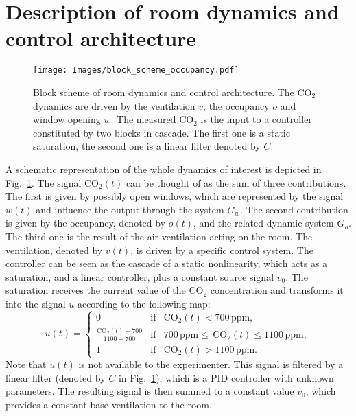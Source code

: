 \documentclass{article}
\begin{document}
\section{Description of room dynamics and control architecture}\label{sec:schematic}
\begin{figure}[htb]
\centering
\texttt{[image: Images/block\_scheme\_occupancy.pdf]}
\caption{Block scheme of room dynamics and control architecture. The CO$_2$ dynamics are driven by the ventilation $v$, the occupancy $o$ and window opening $w$. The measured CO$_2$ is the input to a controller constituted by two blocks in cascade. The first one is a static saturation, the second one is a linear filter denoted by $C$.}
\label{fig:block_scheme}
\end{figure}
A schematic representation of the whole dynamics of interest is depicted in
Fig.~\ref{fig:block_scheme}. The signal CO$_2(t)$ can be thought of as the sum
of three contributions. The first is given by possibly open windows, which are
represented by the signal $w(t)$ and influence the output through the system
$G_w$. The second contribution is given by the occupancy, denoted by $o(t)$,
and the related dynamic system $G_o$. The third one is the result of the air
ventilation acting on the room. The ventilation, denoted by $v(t)$, is driven
by a specific control system. The controller can be seen as the cascade of a
static nonlinearity, which acts as a saturation, and a linear controller, plus
a constant source signal $v_0$. The saturation receives the current value of
the CO$_2$ concentration and transforms it into the signal $u$ according to the
following map:
\begin{equation}\label{eq:saturator}
u(t) = \left\{ \begin{array}{lcl}
				0 & \mbox{if} & \textrm{CO}_2(t) < 700\,\textrm{ppm},\\
				\frac{\textrm{CO}_2(t)-700}{1100-700} & \mbox{if} &  700\,\textrm{ppm} \leq\,\textrm{CO}_2(t) \leq 1100\,\textrm{ppm},\\
				1 & \mbox{if} & \textrm{CO}_2(t) > 1100\,\textrm{ppm}.  \end{array} \right.
\end{equation}
Note that $u(t)$ is not available to the experimenter. This signal is filtered
by a linear filter (denoted by $C$ in Fig.~\ref{fig:block_scheme}), which is a
PID controller with unknown parameters. The resulting signal is then summed to
a constant value $v_0$, which provides a constant base ventilation to the room.
\end{document}
